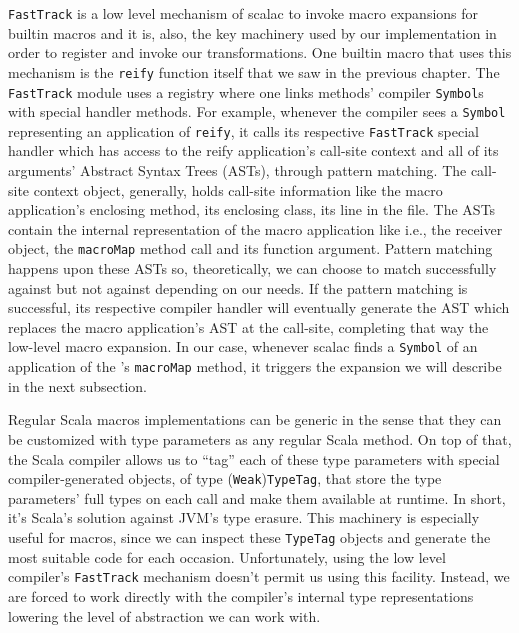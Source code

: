 \texttt{FastTrack} is a low level mechanism of scalac to invoke macro
expansions for builtin macros and it is, also, the key machinery used by our
implementation in order to register and invoke our transformations. One builtin
macro that uses this mechanism is the \texttt{reify} function itself that we saw in the
previous chapter. The \texttt{FastTrack} module uses a registry where one links
methods' compiler \texttt{Symbol}s with special handler methods. For example, whenever
the compiler sees a \texttt{Symbol} representing an application of \texttt{reify}, it calls its
respective \texttt{FastTrack} special handler which has access to the reify application's
call-site context and all of  its arguments' Abstract Syntax Trees (ASTs),
through pattern matching. The call-site context object, generally, holds
call-site information like the macro application's enclosing method, its
enclosing class, its line in the file. The ASTs contain the internal
representation of the macro application like 
i.e., the receiver object, the \texttt{macroMap} method call and its function argument.
Pattern matching happens upon these ASTs so, theoretically, we can choose to
match successfully against  but not against  depending on our needs. If the pattern
matching is successful, its respective compiler handler will eventually generate
the AST which replaces the macro application's AST at the call-site, completing
that way the low-level macro expansion. In our case, whenever scalac finds a
\texttt{Symbol} of an application of the 's
\texttt{macroMap} method, it triggers the expansion we will describe in the next
subsection.

Regular Scala macros implementations can be generic in the sense that they can
be customized with type parameters as any regular Scala method. On top of that,
the Scala compiler allows us to ``tag'' each of these type parameters with
special compiler-generated objects, of type (\texttt{Weak})\texttt{TypeTag}\cite{oliveira_type_2010}, that store the
type parameters' full types on each call and make them available at runtime. In
short, it's Scala's solution against JVM's type erasure. This machinery is
especially useful for macros, since we can inspect these \texttt{TypeTag} objects and
generate the most suitable code for each occasion. Unfortunately, using the low
level compiler's \texttt{FastTrack} mechanism doesn't permit us using this facility.
Instead, we are forced to work directly with the compiler's internal type
representations lowering the level of abstraction we can work with.

